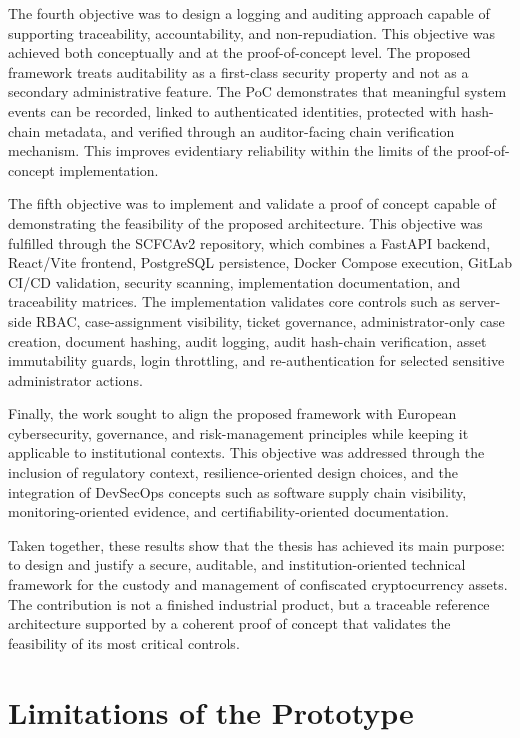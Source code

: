 \documentclass[12pt,a4paper]{report}
\begin{document}
The fourth objective was to design a logging and auditing approach capable of supporting traceability, accountability, and non-repudiation. This objective was achieved both conceptually and at the proof-of-concept level. The proposed framework treats auditability as a first-class security property and not as a secondary administrative feature. The PoC demonstrates that meaningful system events can be recorded, linked to authenticated identities, protected with hash-chain metadata, and verified through an auditor-facing chain verification mechanism. This improves evidentiary reliability within the limits of the proof-of-concept implementation.

The fifth objective was to implement and validate a proof of concept capable of demonstrating the feasibility of the proposed architecture. This objective was fulfilled through the SCFCAv2 repository, which combines a FastAPI backend, React/Vite frontend, PostgreSQL persistence, Docker Compose execution, GitLab CI/CD validation, security scanning, implementation documentation, and traceability matrices. The implementation validates core controls such as server-side RBAC, case-assignment visibility, ticket governance, administrator-only case creation, document hashing, audit logging, audit hash-chain verification, asset immutability guards, login throttling, and re-authentication for selected sensitive administrator actions.

Finally, the work sought to align the proposed framework with European cybersecurity, governance, and risk-management principles while keeping it applicable to institutional contexts. This objective was addressed through the inclusion of regulatory context, resilience-oriented design choices, and the integration of DevSecOps concepts such as software supply chain visibility, monitoring-oriented evidence, and certifiability-oriented documentation.

Taken together, these results show that the thesis has achieved its main purpose: to design and justify a secure, auditable, and institution-oriented technical framework for the custody and management of confiscated cryptocurrency assets. The contribution is not a finished industrial product, but a traceable reference architecture supported by a coherent proof of concept that validates the feasibility of its most critical controls.

\section{Limitations of the Prototype}
\end{document}
